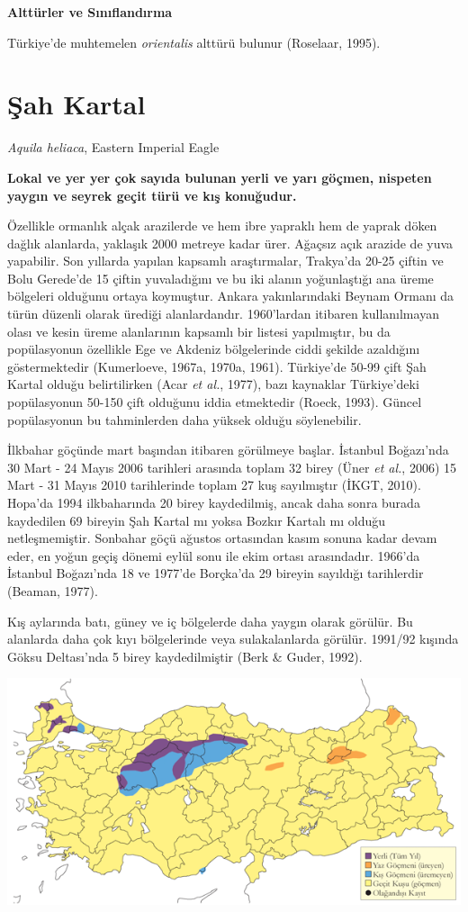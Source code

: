 \documentclass[
  a4paper,
  DIV=11,
  numbers=noendperiod]{scrreprt}
\begin{document}
\textbf{Alttürler ve Sınıflandırma}

Türkiye'de muhtemelen \emph{orientalis} alttürü bulunur (Roselaar,
1995).

\section{Şah Kartal}\label{ux15fah-kartal}

\emph{Aquila heliaca}, Eastern Imperial Eagle

\textbf{Lokal ve yer yer çok sayıda bulunan yerli ve yarı göçmen,
nispeten yaygın ve seyrek geçit türü ve kış konuğudur.}

Özellikle ormanlık alçak arazilerde ve hem ibre yapraklı hem de yaprak
döken dağlık alanlarda, yaklaşık 2000 metreye kadar ürer. Ağaçsız açık
arazide de yuva yapabilir. Son yıllarda yapılan kapsamlı araştırmalar,
Trakya'da 20-25 çiftin ve Bolu Gerede'de 15 çiftin yuvaladığını ve bu
iki alanın yoğunlaştığı ana üreme bölgeleri olduğunu ortaya koymuştur.
Ankara yakınlarındaki Beynam Ormanı da türün düzenli olarak ürediği
alanlardandır. 1960'lardan itibaren kullanılmayan olası ve kesin üreme
alanlarının kapsamlı bir listesi yapılmıştır, bu da popülasyonun
özellikle Ege ve Akdeniz bölgelerinde ciddi şekilde azaldığını
göstermektedir (Kumerloeve, 1967a, 1970a, 1961). Türkiye'de 50-99 çift
Şah Kartal olduğu belirtilirken (Acar \emph{et al.}, 1977), bazı
kaynaklar Türkiye'deki popülasyonun 50-150 çift olduğunu iddia
etmektedir (Roeck, 1993). Güncel popülasyonun bu tahminlerden daha
yüksek olduğu söylenebilir.

İlkbahar göçünde mart başından itibaren görülmeye başlar. İstanbul
Boğazı'nda 30 Mart - 24 Mayıs 2006 tarihleri arasında toplam 32 birey
(Üner \emph{et al.}, 2006) 15 Mart - 31 Mayıs 2010 tarihlerinde toplam
27 kuş sayılmıştır (İKGT, 2010). Hopa'da 1994 ilkbaharında 20 birey
kaydedilmiş, ancak daha sonra burada kaydedilen 69 bireyin Şah Kartal mı
yoksa Bozkır Kartalı mı olduğu netleşmemiştir. Sonbahar göçü ağustos
ortasından kasım sonuna kadar devam eder, en yoğun geçiş dönemi eylül
sonu ile ekim ortası arasındadır. 1966'da İstanbul Boğazı'nda 18 ve
1977'de Borçka'da 29 bireyin sayıldığı tarihlerdir (Beaman, 1977).

Kış aylarında batı, güney ve iç bölgelerde daha yaygın olarak görülür.
Bu alanlarda daha çok kıyı bölgelerinde veya sulakalanlarda görülür.
1991/92 kışında Göksu Deltası'nda 5 birey kaydedilmiştir (Berk \& Guder,
1992).

\includegraphics{images/harita_Page_095.png}
\end{document}

